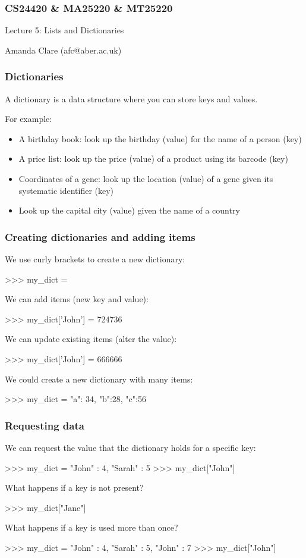 \documentclass{beamer}
\begin{document}

\begin{frame}
\frametitle{CS24420 \& MA25220 \& MT25220}

\begin{center}
\begin{huge}
Lecture 5: Lists and Dictionaries
\end{huge}
\bigskip

Amanda Clare (afc@aber.ac.uk)

\end{center}
\end{frame}


\begin{frame}[fragile]
\frametitle{Dictionaries}
A dictionary is a data structure where you can store
keys and values.

For example:
\begin{itemize}
\item A birthday book: look up the birthday (value) for the
name of a person (key)
\item A price list: look up the price (value) of a product
using its barcode (key)
\item Coordinates of a gene: look up the location (value)
of a gene given its systematic identifier (key)
\item Look up the capital city (value) given the name of a
country
\end{itemize}
\end{frame}

\begin{frame}[fragile]
\frametitle{Creating dictionaries and adding items}
We use curly brackets to create a new dictionary:
\begin{code}
>>> my_dict = {}
\end{code}
We can add items (new key and value):
\begin{code}
>>> my_dict['John'] = 724736
\end{code}
We can update existing items (alter the value):
\begin{code}
>>> my_dict['John'] = 666666
\end{code}
We could create a new dictionary with many items:
\begin{code}
>>> my_dict = { "a": 34, "b":28, "c":56 }
\end{code}
\end{frame}

\begin{frame}[fragile]
\frametitle{Requesting data}
We can request the value that the dictionary holds for a specific
key:
\begin{code}
>>> my_dict = { "John" : 4, "Sarah" : 5 }
>>> my_dict["John"]
\end{code}
 What happens if a key is not present?
\begin{code}
>>> my_dict["Jane"]
\end{code}
 What happens if a key is used more than once?
\begin{code}
>>> my_dict = { "John" : 4, "Sarah" : 5, "John" : 7 }
>>> my_dict["John"]
\end{code}
\end{frame}
\end{document}
